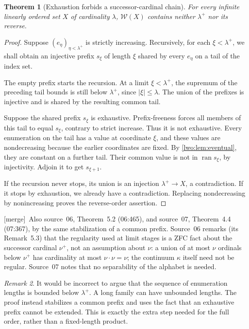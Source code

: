 \documentclass[11pt,a4paper]{article}
\newtheorem{theorem}{Theorem}[section]
\theoremstyle{definition}
\theoremstyle{remark}
\newtheorem{remark}[theorem]{Remark}
\newcommand{\W}{\mathcal W}
\newcommand{\ran}{\operatorname{ran}}
\newcommand{\merge}{\textsf{[merge]}}
\begin{document}
\begin{theorem}[Exhaustion forbids a successor-cardinal chain]\label{lwo:thm:no-long}
For every infinite linearly ordered set $X$ of cardinality $\lambda$,
$\W(X)$ contains neither $\lambda^+$ nor its reverse.
\end{theorem}
\begin{proof}
Suppose $(e_\eta)_{\eta<\lambda^+}$ is strictly increasing. Recursively, for
each $\xi<\lambda^+$, we shall obtain an injective prefix $s_\xi$ of length
$\xi$ shared by every $e_\eta$ on a tail of the index set.

The empty prefix starts the recursion. At a limit $\xi<\lambda^+$, the
supremum of the preceding tail bounds is still below $\lambda^+$, since
$|\xi|\leq\lambda$. The union of the prefixes is injective and is shared
by the resulting common tail.

Suppose the shared prefix $s_\xi$ is exhaustive. Prefix-freeness forces all
members of this tail to equal $s_\xi$, contrary to strict increase. Thus it
is not exhaustive. Every enumeration on the tail has a value at coordinate
$\xi$, and these values are nondecreasing because the earlier coordinates
are fixed. By \cref{lwo:lem:eventual}, they are constant on a further tail.
Their common value is not in $\ran s_\xi$, by injectivity. Adjoin it to get
$s_{\xi+1}$.

If the recursion never stops, its union is an injection
$\lambda^+\to X$, a contradiction. If it stops by exhaustion, we already
have a contradiction. Replacing nondecreasing by nonincreasing proves the
reverse-order assertion.
\end{proof}
\merge\ Also source~06, Theorem~5.2 (06:465), and source~07, Theorem~4.4
(07:367), by the same stabilization of a common prefix. Source~06 remarks
(its Remark~5.3) that the regularity used at limit stages is a ZFC fact about
the successor cardinal $\nu^+$, not an assumption about $\nu$: a union of at
most $\nu$ ordinals below $\nu^+$ has cardinality at most $\nu\cdot\nu=\nu$;
the continuum $\kappa$ itself need not be regular. Source~07 notes that no
separability of the alphabet is needed.

\begin{remark}
It would be incorrect to argue that the sequence of enumeration lengths is
bounded below $\lambda^+$. A long family can have unbounded lengths. The
proof instead stabilizes a common prefix and uses the fact that an exhaustive
prefix cannot be extended. This is exactly the extra step needed for the
full order, rather than a fixed-length product.
\end{remark}
\end{document}

